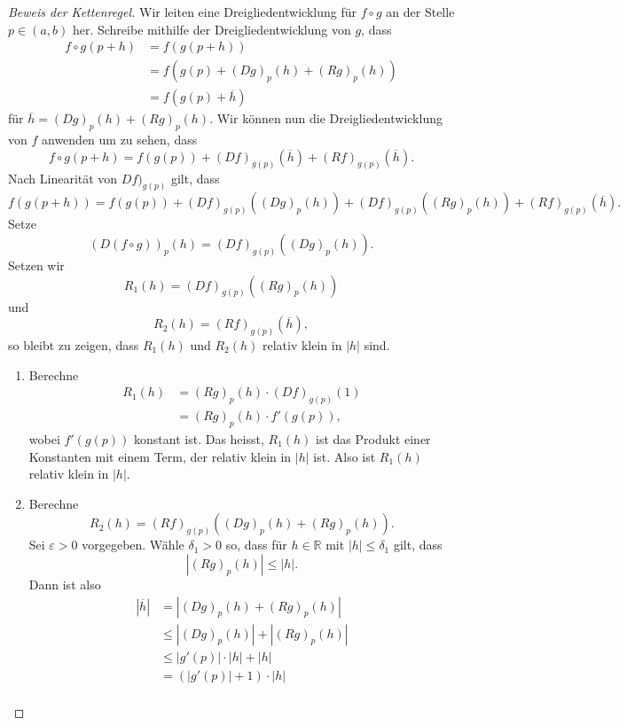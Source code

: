 \documentclass[../main.tex]{subfiles}
\begin{document}
\begin{proof}[Beweis der Kettenregel]
  Wir leiten eine Dreigliedentwicklung
  für $f \circ g$ an der Stelle $p \in (a, b)$ her.
  Schreibe mithilfe der Dreigliedentwicklung
  von $g$, dass
  \begin{align*}
    f \circ g(p + h) 
    &= f(g(p+h))  \\
    &= f(g(p) + {(Dg)}_p(h) + {(Rg)}_p(h)) \\
    &= f(g(p) + \overline h)
  \end{align*}
  für $\overline h = {(Dg)}_p(h) + {(Rg)}_p(h)$.
  Wir können nun die Dreigliedentwicklung von $f$ 
  anwenden um zu sehen, dass
  \[
    f \circ g(p + h) = f(g(p)) + {(Df)}_{g(p)}(\overline h)
    + {(Rf)}_{g(p)}(\overline h).
  \]
  Nach Linearität von ${Df)}_{g(p)}$ gilt, dass
  \[
    f(g(p+h)) = f(g(p)) + {(Df)}_{g(p)}(
    {(Dg)}_p(h))
    + {(Df)}_{g(p)}({(Rg)}_p(h))
    + {(Rf)}_{g(p)}(\overline h).
  \]
  Setze
  \[
    {(D(f \circ g))}_p(h) = {(Df)}_{g(p)}({(Dg)}_p(h)).
  \]
  Setzen wir
  \[
    R_1(h) = {(Df)}_{g(p)}({(Rg)}_p(h))
  \]
  und
  \[
    R_2(h) = {(Rf)}_{g(p)}(\overline h),
  \]
  so bleibt zu zeigen, dass $R_1(h)$ 
  und $R_2(h)$ relativ klein
  in $|h|$ sind.
  \begin{enumerate}[(1)]
    \item Berechne
      \begin{align*}
        R_1(h)
        & = {(Rg)}_p(h) \cdot {(Df)}_{g(p)}(1)\\
        & = {(Rg)}_p(h) \cdot f'(g(p)),
      \end{align*}
      wobei $f'(g(p))$ konstant ist.
      Das heisst, $R_1(h)$ ist das
      Produkt einer Konstanten mit
      einem Term, der relativ klein in $|h|$ ist.
      Also ist $R_1(h)$ relativ klein in $|h|$.
    \item Berechne
      \[
        R_2(h) 
        = {(Rf)}_{g(p)}({(Dg)}_p(h) + {(Rg)}_p(h)).
      \]
      Sei $\varepsilon > 0$ vorgegeben. Wähle
      $\delta_1 > 0$ so, dass
      für $h \in \mathbb{R}$ mit $|h| \leq \delta_1$ gilt,
      dass
      \[
        |{(Rg)}_p(h)| \leq |h|.
      \]
      Dann ist also
      \begin{align*}
         |\overline h| 
         & = |{(Dg)}_p(h) + {(Rg)}_p(h)|\\
         & \leq |{(Dg)}_p(h)| + |{(Rg)}_p(h)| \\
         &\leq |g'(p)| \cdot |h| + |h| \\
         &= (|g'(p)| + 1) \cdot |h| \\

\end{align*}
\end{enumerate}
\end{proof}
\end{document}
